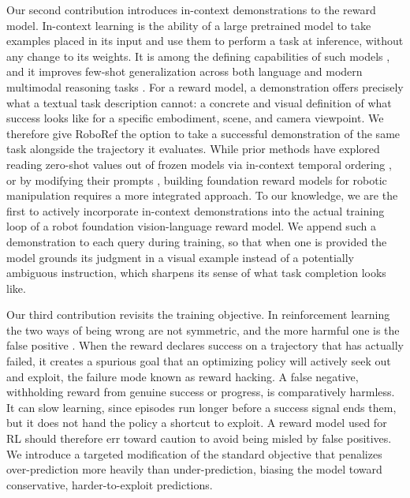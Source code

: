 Our second contribution introduces in-context demonstrations to the reward model. In-context learning is the ability of a large pretrained model to take examples placed in its input and use them to perform a task at inference, without any change to its weights. It is among the defining capabilities of such models \citep{brown_language_2020}, and it improves few-shot generalization across both language \citep{dong_survey_2024} and modern multimodal reasoning tasks \citep{wang_qwen2-vl_2024}. For a reward model, a demonstration offers precisely what a textual task description cannot: a concrete and visual definition of what success looks like for a specific embodiment, scene, and camera viewpoint. We therefore give RoboRef the option to take a successful demonstration of the same task alongside the trajectory it evaluates. While prior methods have explored reading zero-shot values out of frozen models via in-context temporal ordering \citep{ma_vision_2025}, or by modifying their prompts \citep{gumbsch_demonstrations_2026}, building foundation reward models for robotic manipulation requires a more integrated approach. To our knowledge, we are the first to actively incorporate in-context demonstrations into the actual training loop of a robot foundation vision-language reward model. We append such a demonstration to each query during training, so that when one is provided the model grounds its judgment in a visual example instead of a potentially ambiguous instruction, which sharpens its sense of what task completion looks like.

Our third contribution revisits the training objective. In reinforcement learning the two ways of being wrong are not symmetric, and the more harmful one is the false positive \citep{gumbsch_demonstrations_2026}. When the reward declares success on a trajectory that has actually failed, it creates a spurious goal that an optimizing policy will actively seek out and exploit, the failure mode known as reward hacking. A false negative, withholding reward from genuine success or progress, is comparatively harmless. It can slow learning, since episodes run longer before a success signal ends them, but it does not hand the policy a shortcut to exploit. A reward model used for RL should therefore err toward caution to avoid being misled by false positives. We introduce a targeted modification of the standard objective that penalizes over-prediction more heavily than under-prediction, biasing the model toward conservative, harder-to-exploit predictions.

